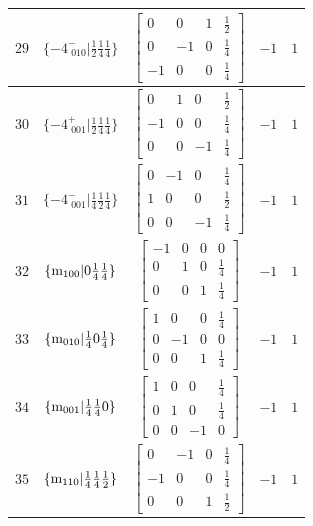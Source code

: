 \documentclass[fleqn,8pt]{jsarticle}
\begin{document}
\begin{longtable}{ccccc}
$ 29 $ & $ \{-4^{-}_{\,\,010}|\frac{1}{2} \frac{1}{4} \frac{1}{4}\} $ & $ \begin{bmatrix} 0 & 0 & 1 & \frac{1}{2} \\ 0 & -1 & 0 & \frac{1}{4} \\ -1 & 0 & 0 & \frac{1}{4} \end{bmatrix} $ & $ -1 $ & $ 1 $ \\ \hline
$ 30 $ & $ \{-4^{+}_{\,\,001}|\frac{1}{2} \frac{1}{4} \frac{1}{4}\} $ & $ \begin{bmatrix} 0 & 1 & 0 & \frac{1}{2} \\ -1 & 0 & 0 & \frac{1}{4} \\ 0 & 0 & -1 & \frac{1}{4} \end{bmatrix} $ & $ -1 $ & $ 1 $ \\ \hline
$ 31 $ & $ \{-4^{-}_{\,\,001}|\frac{1}{4} \frac{1}{2} \frac{1}{4}\} $ & $ \begin{bmatrix} 0 & -1 & 0 & \frac{1}{4} \\ 1 & 0 & 0 & \frac{1}{2} \\ 0 & 0 & -1 & \frac{1}{4} \end{bmatrix} $ & $ -1 $ & $ 1 $ \\ \hline
$ 32 $ & $ \{{\rm m}_{100}|0 \frac{1}{4} \frac{1}{4}\} $ & $ \begin{bmatrix} -1 & 0 & 0 & 0 \\ 0 & 1 & 0 & \frac{1}{4} \\ 0 & 0 & 1 & \frac{1}{4} \end{bmatrix} $ & $ -1 $ & $ 1 $ \\ \hline
$ 33 $ & $ \{{\rm m}_{010}|\frac{1}{4} 0 \frac{1}{4}\} $ & $ \begin{bmatrix} 1 & 0 & 0 & \frac{1}{4} \\ 0 & -1 & 0 & 0 \\ 0 & 0 & 1 & \frac{1}{4} \end{bmatrix} $ & $ -1 $ & $ 1 $ \\ \hline
$ 34 $ & $ \{{\rm m}_{001}|\frac{1}{4} \frac{1}{4} 0\} $ & $ \begin{bmatrix} 1 & 0 & 0 & \frac{1}{4} \\ 0 & 1 & 0 & \frac{1}{4} \\ 0 & 0 & -1 & 0 \end{bmatrix} $ & $ -1 $ & $ 1 $ \\ \hline
$ 35 $ & $ \{{\rm m}_{110}|\frac{1}{4} \frac{1}{4} \frac{1}{2}\} $ & $ \begin{bmatrix} 0 & -1 & 0 & \frac{1}{4} \\ -1 & 0 & 0 & \frac{1}{4} \\ 0 & 0 & 1 & \frac{1}{2} \end{bmatrix} $ & $ -1 $ & $ 1 $ \\ \hline

\end{longtable}
\end{document}
